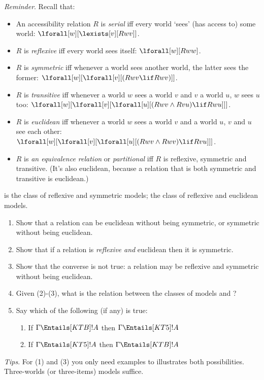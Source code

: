 \documentclass[../../../../include/open-logic-section]{subfiles}
\begin{document}
\begin{prob}
\emph{Reminder}. Recall that: 

\begin{itemize}
	\item An accessibility relation $R$ is \emph{serial} iff every world `sees' 
	(has access to) some world: $\lforall[w][\lexists[v][Rwv]]$.
	\item $R$ is \emph{reflexive} iff every world sees itself: $\lforall[w][Rww]$.
	\item $R$ is \emph{symmetric} iff whenever a world sees another world, the latter 
	sees the former: $\lforall[w][\lforall[v][(Rwv \lif Rwv)]]$.
	\item $R$ is \emph{transitive} iff whenever a world $w$ sees a world $v$ and $v$ a world $u$, $w$ sees $u$ too: $\lforall[w][\lforall[v][\lforall[u][(Rwv \land Rvu) \lif Rwu]]]$.
	\item $R$ is \emph{euclidean} iff whenever a world $w$ sees a world $v$ and a world $u$, $v$ and $u$ see each other: $\lforall[w][\lforall[v][\lforall[u][(Rwv \land Rwv) \lif Rvu]]]$.
	\item $R$ is \emph{an equivalence relation} or \emph{partitional} iff $R$ is reflexive,
	symmetric and transitive. (It's also euclidean, because a relation that is both symmetric and transitive is euclidean.)
\end{itemize}

\end{prob}

\begin{prob}

 is the class of reflexive and symmetric models;  
the class of reflexive and euclidean models. 
\begin{enumerate}
	\item Show that a relation can be euclidean 
	without being symmetric, or symmetric without being euclidean. 
	\item Show that if a relation is \emph{reflexive and} euclidean then
	it is symmetric. 
	\item Show that the converse is not true: a relation may be reflexive
	and symmetric without being euclidean.
	\item Given (2)-(3), what is the relation between the classes of 
	models  and ?
	\item Say which of the following (if any) is true: 
	\begin{enumerate}
		\item If $\Gamma \Entails[KTB] !A$ then $\Gamma \Entails[KT5] !A$ 
		\item If $\Gamma \Entails[KT5] !A$ then $\Gamma \Entails[KTB] !A$ 
	\end{enumerate}	
\end{enumerate}	

\emph{Tips}. For (1) and (3) you only need examples to illustrates both possibilities. 
	Three-worlds (or three-items) models suffice.

\end{prob}
\end{document}
